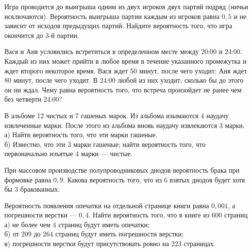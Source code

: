 \newpage\setcounter{zad}{0}



\begin{zkrW}{20}\noindent 
	Игра проводится до выигрыша одним из двух игроков двух партий подряд (ничьи исключаются). Вероятность выигрыша партии каждым из игроков равна $0{,}5$ и не зависит от исходов предыдущих партий. Найдите вероятность того, что игра окончится до 3-й партии.
 
\end{zkrW}

\begin{zkrW}{20}\noindent 
	Вася и Аня условились встретиться в определенном месте между 20:00 и 24:00. Каждый из них может прийти в любое время в течение указанного промежутка и ждет второго некоторое время. Вася ждет 50 минут, после чего уходит; Аня ждет 80 минут, после чего уходит. В 24:00 любой из них уходит, сколько бы до этого он ни ждал. Чему равна вероятность того, что встреча произойдет не ранее чем без четверти 24:00?
 
\end{zkrW}

\begin{zkrW}{20}\noindent 
	В альбоме 12 чистых и 7 гашеных марок. Из альбома изымаются 4 наудачу извлеченные марки. После этого из альбома вновь наудачу извлекаются 3 марки. \\ \indent а) Найти вероятность того, что эти марки гашеные. \\ \indent б) Известно, что эти 3 марки гашеные; найти вероятность того, что первоначально изъятые 4 марки --- чистые.
 
\end{zkrW}

\begin{zkrW}{20}\noindent 
	При массовом производстве полупроводниковых диодов вероятность брака при формовке равна $0{,}9$. Какова вероятность того, что из 6 взятых диодов будет хотя бы 3 бракованных.
 
\end{zkrW}

\begin{zkrW}{20}\noindent 
	Вероятность появления опечатки на отдельной странице книги равна $0{,}001$, а погрешности верстки --- $0{,}4$. Найти вероятность того, что в книге из 600 страниц \\ \indent а) не более чем 4 страниц будут иметь опечатки; \\ \indent б) от 209 до 264 страниц будут иметь погрешности верстки; \\ \indent в) погрешности верстки будут присутствовать ровно на 223 страницах.
 
\end{zkrW}

